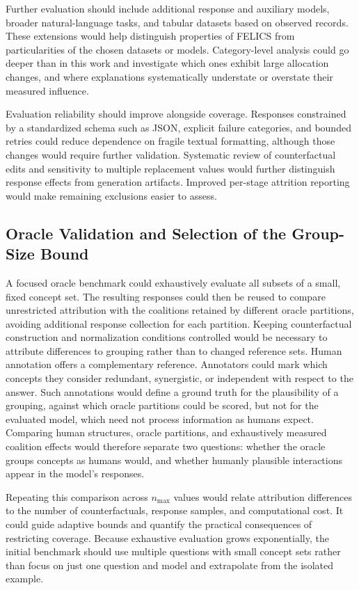Further evaluation should include additional response and auxiliary models, broader natural-language tasks, and tabular datasets based on observed records. These extensions would help distinguish properties of FELICS from particularities of the chosen datasets or models. Category-level analysis could go deeper than in this work and investigate which ones exhibit large allocation changes, and where explanations systematically understate or overstate their measured influence.

Evaluation reliability should improve alongside coverage. Responses constrained by a standardized schema such as JSON, explicit failure categories, and bounded retries could reduce dependence on fragile textual formatting, although those changes would require further validation. Systematic review of counterfactual edits and sensitivity to multiple replacement values would further distinguish response effects from generation artifacts. Improved per-stage attrition reporting would make remaining exclusions easier to assess.

\subsection{Oracle Validation and Selection of the Group-Size Bound}

A focused oracle benchmark could exhaustively evaluate all subsets of a small, fixed concept set. The resulting responses could then be reused to compare unrestricted attribution with the coalitions retained by different oracle partitions, avoiding additional response collection for each partition. Keeping counterfactual construction and normalization conditions controlled would be necessary to attribute differences to grouping rather than to changed reference sets. Human annotation offers a complementary reference. Annotators could mark which concepts they consider redundant, synergistic, or independent with respect to the answer. Such annotations would define a ground truth for the plausibility of a grouping, against which oracle partitions could be scored, but not for the evaluated model, which need not process information as humans expect. Comparing human structures, oracle partitions, and exhaustively measured coalition effects would therefore separate two questions: whether the oracle groups concepts as humans would, and whether humanly plausible interactions appear in the model's responses.

Repeating this comparison across $n_{\max}$ values would relate attribution differences to the number of counterfactuals, response samples, and computational cost. It could guide adaptive bounds and quantify the practical consequences of restricting coverage. Because exhaustive evaluation grows exponentially, the initial benchmark should use multiple questions with small concept sets rather than focus on just one question and model and extrapolate from the isolated example.


